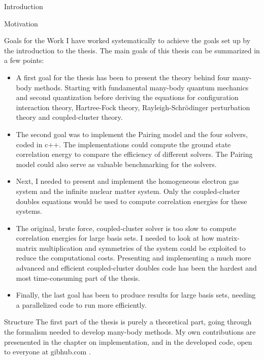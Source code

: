 \documentclass[twoside,english]{uiofysmaster}
\begin{document}
\begin{chapter}{Introduction}
\begin{subsection}{Motivation}
	\end{subsection}

	\begin{subsection}{Goals for the Work}
		I have worked systematically to achieve the goals set up by the introduction to the thesis. The main goals of this thesis can be summarized in a few points: 
		\begin{itemize}
			\item A first goal for the thesis has been to
                          present the theory behind four many-body
                          methods. Starting with fundamental many-body
                          quantum mechanics and second quantization
                          before deriving the equations for
                          configuration interaction theory, Hartree-Fock
                          theory, Rayleigh-Schr\"{o}dinger
                          perturbation theory and coupled-cluster
                          theory.
			\item The second goal was to implement the Pairing model and the four solvers, coded in c++. The implementations could compute the ground state correlation energy to compare the efficiency of different solvers. The Pairing model could also serve as valuable benchmarking for the solvers.
			\item Next, I needed to present and implement the homogeneous electron gas system and the infinite nuclear matter system. Only the coupled-cluster doubles equations would be used to compute correlation energies for these systems. 
			\item The original, brute force, coupled-cluster solver is too slow to compute correlation energies for large basis sets. I needed to look at how matrix-matrix multiplication and symmetries of the system could be exploited to reduce the computational costs. Presenting and implementing a much more advanced and efficient coupled-cluster doubles code has been the hardest and most time-consuming part of the thesis. 
			\item Finally, the last goal has been to produce results for large basis sets, needing a parallelized code to run more efficiently. 
		\end{itemize}
	\end{subsection}

	\begin{subsection}{Structure}
		The first part of the thesis is purely a theoretical part, going through the formalism needed to develop many-body methods. My own contributions are presenented in the chapter on implementation, and in the developed code, open to everyone at gibhub.com \cite{WholmenGithub}.


\end{subsection}
\end{chapter}
\end{document}

